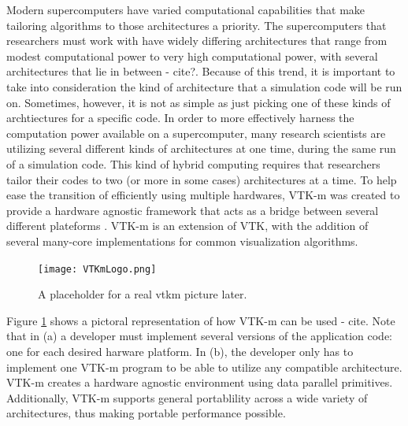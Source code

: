 \documentclass{IEEEtran}
\begin{document}
%
Modern supercomputers have varied computational capabilities that make tailoring algorithms to those architectures a priority.
%
The supercomputers that researchers must work with have widely differing architectures that range from modest computational power to very high computational power, with several architectures that lie in between - cite?.
%
Because of this trend, it is important to take into consideration the kind of architecture that a simulation code will be run on. 
%
Sometimes, however, it is not as simple as just picking one of these kinds of archtiectures for a specific code.
%
In order to more effectively harness the computation power available on a supercomputer, many research scientists are utilizing several different kinds of architectures at one time, during the same run of a simulation code.
%
This kind of hybrid computing requires that researchers tailor their codes to two (or more in some cases)  architectures at a time.
%
To help ease the transition of efficiently using multiple hardwares, VTK-m was created to provide a hardware agnostic framework that acts as a bridge between several different plateforms \cite{Moreland16}.
%
VTK-m is an extension of VTK, with the addition of several many-core implementations for common visualization algorithms.
%
\begin{figure}
  \texttt{[image: VTKmLogo.png]}
  \caption{A placeholder for a real vtkm picture later.}
  \label{fig:vtkm}
\end{figure}
%
Figure \ref{fig:vtkm} shows a pictoral representation of how VTK-m can be used - cite. 
%
Note that in (a) a developer must implement several versions of the application code: one for each desired harware platform.
%
In (b), the developer only has to implement one VTK-m program to be able to utilize any compatible architecture.
%
VTK-m creates a hardware agnostic environment using data parallel primitives.
%
Additionally, VTK-m supports general portablility across a wide variety of architectures, thus making portable performance possible.
\end{document}
